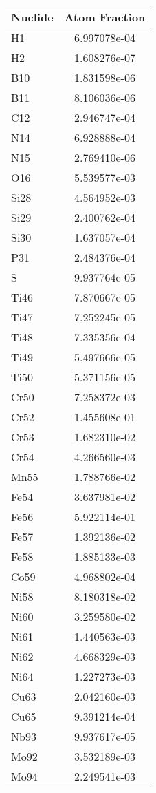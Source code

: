 \begin{centering}
\begin{table}[ht!]
\begin{tabular}{l | c}
\hline
Nuclide & Atom Fraction\\
\hline
H1 & 6.997078e-04\\
H2 & 1.608276e-07\\
B10 & 1.831598e-06\\
B11 & 8.106036e-06\\
C12 & 2.946747e-04\\
N14 & 6.928888e-04\\
N15 & 2.769410e-06\\
O16 & 5.539577e-03\\
Si28 & 4.564952e-03\\
Si29 & 2.400762e-04\\
Si30 & 1.637057e-04\\
P31 & 2.484376e-04\\
S & 9.937764e-05\\
Ti46 & 7.870667e-05\\
Ti47 & 7.252245e-05\\
Ti48 & 7.335356e-04\\
Ti49 & 5.497666e-05\\
Ti50 & 5.371156e-05\\
Cr50 & 7.258372e-03\\
Cr52 & 1.455608e-01\\
Cr53 & 1.682310e-02\\
Cr54 & 4.266560e-03\\
Mn55 & 1.788766e-02\\
Fe54 & 3.637981e-02\\
Fe56 & 5.922114e-01\\
Fe57 & 1.392136e-02\\
Fe58 & 1.885133e-03\\
Co59 & 4.968802e-04\\
Ni58 & 8.180318e-02\\
Ni60 & 3.259580e-02\\
Ni61 & 1.440563e-03\\
Ni62 & 4.668329e-03\\
Ni64 & 1.227273e-03\\
Cu63 & 2.042160e-03\\
Cu65 & 9.391214e-04\\
Nb93 & 9.937617e-05\\
Mo92 & 3.532189e-03\\
Mo94 & 2.249541e-03\\

\end{tabular}
\end{table}
\end{centering}
